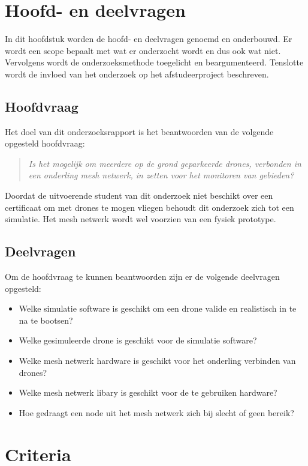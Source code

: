 \documentclass[a4paper, 11pt, oneside]{report}
\begin{document}
\chapter{Hoofd- en deelvragen}
In dit hoofdstuk worden de hoofd- en deelvragen genoemd en onderbouwd.
Er wordt een scope bepaalt met wat er onderzocht wordt en dus ook wat niet.
Vervolgens wordt de onderzoeksmethode toegelicht en beargumenteerd.
Tenslotte wordt de invloed van het onderzoek op het afstudeerproject beschreven.

\section{Hoofdvraag}
Het doel van dit onderzoeksrapport is het beantwoorden van de volgende opgesteld hoofdvraag:
\begin{quotation}
\textit{Is het mogelijk om meerdere op de grond geparkeerde drones, verbonden in een onderling mesh netwerk, in zetten voor het monitoren van gebieden?}	
\end{quotation}
Doordat de uitvoerende student van dit onderzoek niet beschikt over een certificaat om met drones te mogen vliegen behoudt dit onderzoek zich tot een simulatie.
Het mesh netwerk wordt wel voorzien van een fysiek prototype.

\section{Deelvragen}

Om de hoofdvraag te kunnen beantwoorden zijn er de volgende deelvragen opgesteld:

\begin{itemize}
	\item Welke simulatie software is geschikt om een drone valide en realistisch in te na te bootsen?
	\item Welke gesimuleerde drone is geschikt voor de simulatie software?
	\item Welke mesh netwerk hardware is geschikt voor het onderling verbinden van drones?
	\item Welke mesh netwerk libary is geschikt voor de te gebruiken hardware?
	\item Hoe gedraagt een node uit het mesh netwerk zich bij slecht of geen bereik?
\end{itemize}



\chapter{Criteria}
\end{document}

